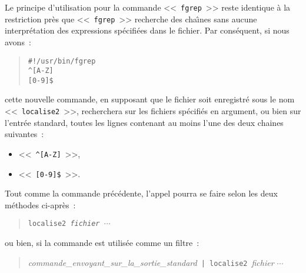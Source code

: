 Le principe d'utilisation pour la commande <<~{\tt fgrep}~>> reste identique {\`a} la restriction pr{\`e}s que <<~{\tt fgrep}~>> recherche des cha{\^\i}nes sans aucune interpr{\'e}tation des expressions sp{\'e}cifi{\'e}es dans le fichier. Par cons{\'e}quent, si nous avons~:
\begin{quote}
\begin{verbatim}
#!/usr/bin/fgrep
^[A-Z]
[0-9]$
\end{verbatim}
\end{quote}
cette nouvelle commande, en supposant que le fichier soit enregistr{\'e} sous le nom <<~{\tt localise2}~>>, recherchera sur les fichiers sp{\'e}cifi{\'e}s en argument, ou bien sur l'entr{\'e}e standard, toutes les lignes contenant au moins l'une des deux chaines suivantes~:
\begin{itemize}
	\item	<<~\verb=^[A-Z]=~>>,
	\item	<<~\verb=[0-9]$=~>>.
\end{itemize}

Tout comme la commande pr{\'e}c{\'e}dente, l'appel pourra se faire selon les deux m{\'e}thodes ci-apr{\`e}s~:
\begin{quote}
{\tt localise2~{\sl fichier $\cdots$}}
\end{quote}
ou bien, si la commande est utilis{\'e}e comme un filtre~:
\begin{quote}
{\sl commande\_envoyant\_sur\_la\_sortie\_standard}~\verb=| localise2=~{\sl fichier $\cdots$}
\end{quote}

